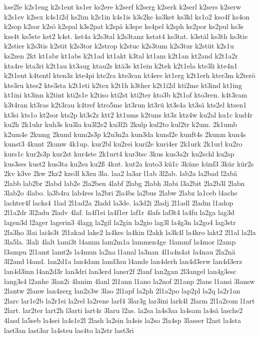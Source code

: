 {kse2le
k2s1eng
k2s1ent
ks1er
ks2ere
k2serf
k2serg
k2serk
k2serl
k2sers
k2serw
k2s1ev
k2sex
k4s1i2d
ks2im
k2s1in
k4s1is
k3s2ke
ks3ket
ks3kl
ks1o2
kso4f
ks4on
k2sop
k2sor
k2sö
k2spal
k3s2pat
k2spä
k3spe
ks4pel
k2sph
ks2por
ks2pul
ks3s
kss4t
ks5ste
kst2
k4st.
kst4a
k2s3tal
k2s3tanz
kstat4
ks3tat.
k3stäl
ks3th
ks3tie
k2stier
k2s3tis
k2stit
k2s3tor
k2strop
k2stuc
k2s3tum
k2s3tur
k2stüt
k2s1u
ks2zen
2kt
kt1abr
kt1abs
k2t1ad
kt1akt
k3tal
kt1am
k2t1an
kt2and
k2t1a2r
kta4re
kta3ri
k2t1au
kt3aug
ktau2s
ktä3s
kt1ein
k2tek
k2t1ela
kte3li
kte4n1
k2t1ent
k4tentl
kten3z
kte4pi
kte2ra
kte3ran
kt4ere
kt1erg
k2t1erh
kter3m
k2terö
kte3ru
ktes2
kte3sta
k2t1eti
k2tex
k2t1h
k3ther
k2t1i2d
kti2me
kt3ind
kt1ing
kt1ini
kt3inn
k2tint
kti2s1e
k2tiso
kti2st
kti2ter
kto3b
k2t1of
kto3ren.
k4t3ram
k3t4ran
kt3ras
k2t3rau
k4tref
ktro5me
kt3run
kt3rü
kt3s4a
kt3sä
kts2el
ktsen1
kt3si
kts1o
kt2sor
kts2p
kt3s2z
ktt2
kt1ums
k2tuns
kt3z
ktz4w
ku2al
ku1c
kud4r
ku2h
2k1uhr
kuh3s
ku3la
ku3l2e2
ku3l2i
2kulp
kul2to
kul2tr
k2um.
2k1umb
k2um4e
2kumg
2kuml
kum2s3p
k2u3n2a
kun3da
kund2e
kunft4s
2kunm
kun4s
kunst3
4kunt
2kunw
4k1up.
kur2bl
ku2rei
kuri2e
kuri4er
2k1urk
2k1url
ku2ro
kurs1c
kur2s3p
kur2st
kur4ste
2k1urt4
kur3tsc
3kus
kus3a2r
ku2schl
ku2sp
kus3ses
kust2
kus3ta
ku2su
ku2ß
4kut.
kut2a
kuto3
kü1c
3küne
künf3
3kür
kür2s
2kv
k3ve
2kw
2kz2
kze3l
k3zu
3la.
laa2
la3ar
l1ab
3l2ab.
lab2a
la2bad
l2abä
2labb
lab2br
2labd
lab2e
2la2ben
4labf
2labg
2labh
3labi
l3a2bit
2la2b3l
2labn
3lab2o
4labo.
la3b4ra
lab4res
la2bri
2la4bs
la2bus
2labw
2labz
la1ceb
l4ache
lachter4f
lacks4
1lad
2l1ad2a
2ladd
la3de.
la3d2i
2ladj
2l1adl
2ladm
l1adop
2l1a2dr
3l2adu
2ladv
4laf.
la4f1ei
la4f1er
laf1r
4lafs
laf3t4
la4fu
la2ga
lag3d
lagen3d
l2ager
lagerin3
4lagg
la2gil
la2gin
la2gio
lag3l
la4g3n
la2go4
lag3str
2la3ho
3lai
lai4s3t
2l1akad
lake2
la4kes
la4kin
l2akk
la3k4l
la4kro
lakt2
2l1al
la2la
3la5la.
3lali
4lalt
lami3t
l4amm
lam2m1a
lammen4ge
1lammf
la4mor
l2amp
l3ampu
2l1amt
lamt2s
la4mun
la2na
l1anal
la3nan
4l1a4n4at
la4nau
2la2nä
3l2and
l4and.
lan2d1a
lan4dam
land3au
l4ande
lan4derh
lan4d3erw
lan4d3erz
lan4d3inn
l4an2d3r
lan3dri
lan3erd
laner2f
2lanf
lan2gan
2l3angel
lan4g3esc
lang3s4
l2anhe
3lan2i
4lanim
4lanl
2l1ann
l1ano
la2nof
2l1anp
2lans
l1ansi
3lansw
2lantw
2lanw
lan4zerg
lan2z3w
3lao
2l1apf
la2ph
2l1a2po
lap2pl
la2q
la2r1an
2larc
lar1e2b
la2r1ei
la2rel
la2rene
larf4
3lar3g
lar3ini
lark4l
2larm
2l1a2rom
l1art
2lart.
lar2ter
lart2h
l3arti
lart4r
3laru
l2as.
la2sa
la4s3aa
la4sam
la4sä
lasche2
4lasd
la5seb
la4sei
la4s1e2l
2lash
la2sin
la4sis
la2so
2la4sp
3lasser
l2ast
la4sta
last3an
last3ar
la4steu
las4to
la2str
last3ri
}
